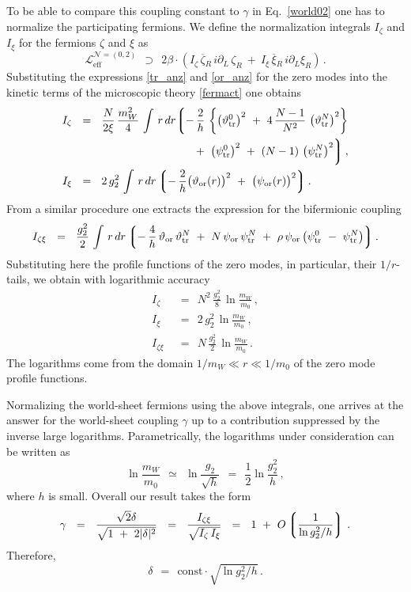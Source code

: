 \documentclass[12pt]{article}
\def\beq{\begin{equation}}
\def\eeq{\end{equation}}
\newcommand{\p}{\partial}
\newcommand{\ov}{\overline}
\newcommand{\mc}[1]{\mathcal{#1}}
\newcommand{\lgr}{\left\lgroup}
\newcommand{\rgr}{\right\rgroup}
\newcommand{\bxir}{\ov{\xi}{}_R}
\newcommand{\xir}{\xi_R}
\newcommand{\bzr}{\ov{\zeta}{}_R}
\newcommand{\zr}{\zeta_R}
\newcommand{\pts}{\psi_{\rm tr}^0}
\newcommand{\ptN}{\psi_{\rm tr}^N}
\newcommand{\tts}{\vartheta_{\rm tr}^0}
\newcommand{\ttN}{\vartheta_{\rm tr}^N}
\newcommand{\tor}{\vartheta_{\rm or}}
\newcommand{\por}{\psi_{\rm or}}
\begin{document}
To be able to compare this coupling constant to $ \gamma $ in Eq.~\eqref{world02} one has to normalize 
the participating fermions.
We define the normalization integrals $ I_\zeta $ and $ I_\xi $ for the fermions $ \zeta $ and $ \xi $ as
\beq
\label{kin_norm}
	\mc{L}_\text{eff}^{\mc{N}=(0,2)} ~~\supset~~
	2\beta \cdot ( I_\zeta\, \bzr\, i\p_L\,\zr  ~+~ I_\xi\, \bxir\, i\p_L \xir ) \,.
\eeq
Substituting the expressions \eqref{tr_anz} and \eqref{or_anz} for the zero modes into the kinetic terms
of the microscopic theory \eqref{fermact} one obtains
\begin{align*}
%
	I_\zeta & ~~=~~ \frac{N}{2\xi}\, \frac{m_W^2}{4}\, \int\, r\,dr 
		\biggl\lgroup -\, \frac{2}{h}\, 
			  \left\{ \left( \tts \right)^2 
				~+~ 4\,\frac{N-1}{N^2}\, \left( \ttN \right)^2 \right\} \\
		& \qquad\qquad\qquad\qquad\qquad~~
			~+~ \left( \pts \right)^2 ~+~ (N-1)\,\left( \ptN \right)^2  \biggr\rgroup\,, \\
%
	I_\xi & ~~=~~ 2\,g_2^2\, \int\, r\,dr 
		\lgr -\,\frac{2}{h}\bigl( \tor(r) \bigr)^2 ~+~ \bigl( \por(r) \bigr)^2 \rgr.
\end{align*}
From a similar procedure one extracts the expression for the bifermionic coupling
\[
	I_{\zeta\xi} ~~=~~ \frac{g_2^2}{2}\, \int\, r\,dr
		\lgr -\,\frac{4}{h}\,\tor\,\ttN  ~+~ N\, \por\,\ptN  
			~+~ \rho\, \por \left( \pts ~-~ \ptN \right) \rgr.
\]
Substituting here the profile functions of the zero modes, in particular, their $ 1/r $-tails,
we obtain with logarithmic accuracy
\begin{align*}
%
	I_\zeta & ~~=~~ N^2\,\frac{g_2^2}{8}\, \ln \frac{m_W}{m_0}\,, \\
%
	I_\xi   & ~~=~~ 2\,g_2^2\, \ln \frac{m_W}{m_0}\,, \\
%
	I_{\zeta\xi} & ~~=~~ N\, \frac{g_2^2}{2}\,  \ln \frac{m_W}{m_0}\,.
\end{align*}
The logarithms come from the domain $ 1/m_W \ll r \ll 1/m_0 $  of the zero mode profile
functions.

Normalizing the world-sheet fermions using the above integrals, one arrives at the answer
for the world-sheet coupling $ \gamma $ up to a contribution suppressed by the inverse large logarithms.
Parametrically, the logarithms under consideration can be written as 
\[
	\ln \frac{m_W}{m_0}  ~~\simeq~~ 
			\ln \frac{g_2}{\sqrt{h}} ~~=~~ \frac12 \ln \frac{g_2^2}{h}\,,
\]
where $ h $ is small.
Overall our result takes the form
\[
	\gamma ~~=~~ \frac{\sqrt{2}\delta}{\sqrt{1 ~+~ 2|\delta|^2}} ~~=~~ 
		\frac{I_{\zeta\xi}}{\sqrt{I_\zeta\, I_\xi}}  ~~=~~
			1 ~+~ O\lgr \frac{1}{\ln g_2^2/h } \rgr\,.
\]
Therefore, 
\beq
\label{deltaresult}
	\delta ~~=~~ \text{const}\cdot \sqrt{\ln g_2^2/h}\,.
\eeq
\end{document}
